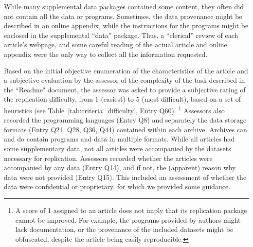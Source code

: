 \documentclass{cje} %
\theoremstyle{plain}%
\theoremstyle{definition}
\theoremstyle{remark}
\begin{document}
While many supplemental data packages contained some content, they often did not contain all the data or programs. Sometimes, the data provenance might be described in an online appendix, while the instructions for the programs might be enclosed in the supplemental ``data'' package. Thus, a ``clerical'' review of each article's webpage, and some careful reading of the actual article and online appendix were the only way to collect all the information requested. 

Based on the initial objective enumeration of the characteristics of the article and a subjective evaluation by the assessor of the complexity of the task described in the ``Readme" document, the assessor was asked to provide a subjective rating of the replication difficulty, from 1 (easiest) to 5 (most difficult), based on a set of heuristics (see Table~\ref{tab:criteria_difficulty}, Entry Q60).%
\footnote{A score of 1 assigned to an article does not imply that its replication package cannot be improved. For example, the programs provided by authors might lack documentation, or the provenance of the included datasets might be obfuscated, despite  the article being easily reproducible.}
Assessors also recorded the programming languages (Entry Q8) and separately the data storage formats (Entry Q21, Q28, Q36, Q44) contained within each archive. Archives can and do contain programs and data in multiple formats.
While all articles had some supplementary data, not all articles were accompanied by the datasets necessary for replication. Assessors recorded  whether the articles were accompanied by any data (Entry Q14), and if not, the (apparent) reason why data were not provided (Entry Q15). This included an assessment of whether the data were confidential or proprietary, for which we provided some guidance.
\end{document}
